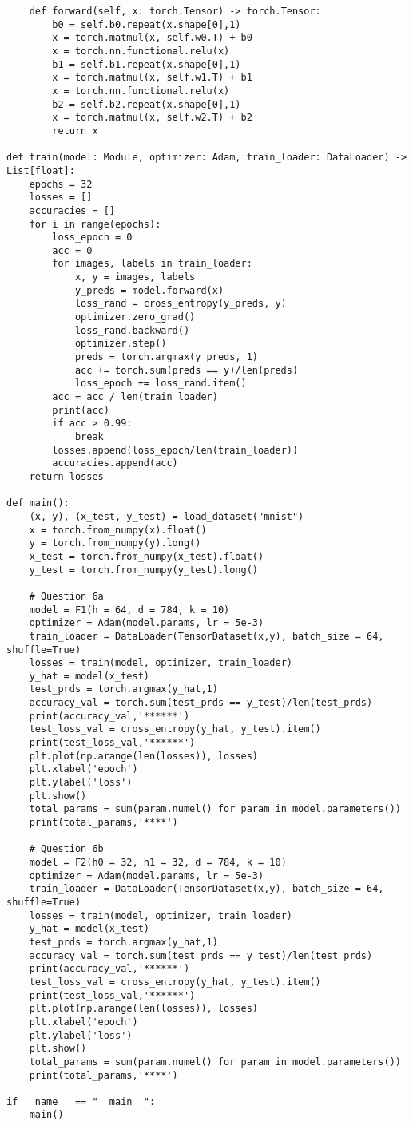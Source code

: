 \documentclass{article}
\begin{document}
\begin{lstlisting}
    def forward(self, x: torch.Tensor) -> torch.Tensor:
        b0 = self.b0.repeat(x.shape[0],1)
        x = torch.matmul(x, self.w0.T) + b0
        x = torch.nn.functional.relu(x)
        b1 = self.b1.repeat(x.shape[0],1)
        x = torch.matmul(x, self.w1.T) + b1
        x = torch.nn.functional.relu(x)
        b2 = self.b2.repeat(x.shape[0],1)
        x = torch.matmul(x, self.w2.T) + b2
        return x

def train(model: Module, optimizer: Adam, train_loader: DataLoader) -> List[float]:
    epochs = 32
    losses = []
    accuracies = []
    for i in range(epochs):
        loss_epoch = 0
        acc = 0
        for images, labels in train_loader:
            x, y = images, labels
            y_preds = model.forward(x) 
            loss_rand = cross_entropy(y_preds, y)
            optimizer.zero_grad()
            loss_rand.backward()
            optimizer.step()
            preds = torch.argmax(y_preds, 1)
            acc += torch.sum(preds == y)/len(preds)
            loss_epoch += loss_rand.item()
        acc = acc / len(train_loader)
        print(acc)
        if acc > 0.99:
            break
        losses.append(loss_epoch/len(train_loader))
        accuracies.append(acc)
    return losses

def main():
    (x, y), (x_test, y_test) = load_dataset("mnist")
    x = torch.from_numpy(x).float()
    y = torch.from_numpy(y).long()
    x_test = torch.from_numpy(x_test).float()
    y_test = torch.from_numpy(y_test).long()
    
    # Question 6a
    model = F1(h = 64, d = 784, k = 10)
    optimizer = Adam(model.params, lr = 5e-3)
    train_loader = DataLoader(TensorDataset(x,y), batch_size = 64, shuffle=True)
    losses = train(model, optimizer, train_loader)
    y_hat = model(x_test)
    test_prds = torch.argmax(y_hat,1)
    accuracy_val = torch.sum(test_prds == y_test)/len(test_prds)
    print(accuracy_val,'******')
    test_loss_val = cross_entropy(y_hat, y_test).item()
    print(test_loss_val,'******')
    plt.plot(np.arange(len(losses)), losses)
    plt.xlabel('epoch')
    plt.ylabel('loss')
    plt.show()
    total_params = sum(param.numel() for param in model.parameters())
    print(total_params,'****')

    # Question 6b
    model = F2(h0 = 32, h1 = 32, d = 784, k = 10)
    optimizer = Adam(model.params, lr = 5e-3)
    train_loader = DataLoader(TensorDataset(x,y), batch_size = 64, shuffle=True)
    losses = train(model, optimizer, train_loader)
    y_hat = model(x_test)
    test_prds = torch.argmax(y_hat,1)
    accuracy_val = torch.sum(test_prds == y_test)/len(test_prds)
    print(accuracy_val,'******')
    test_loss_val = cross_entropy(y_hat, y_test).item()
    print(test_loss_val,'******')
    plt.plot(np.arange(len(losses)), losses)
    plt.xlabel('epoch')
    plt.ylabel('loss')
    plt.show()
    total_params = sum(param.numel() for param in model.parameters())
    print(total_params,'****')

if __name__ == "__main__":
    main()
        \end{lstlisting}
\end{document}
